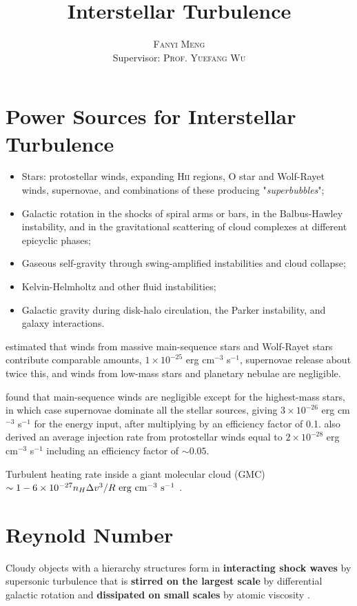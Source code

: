 \documentclass[12pt]{article}
\title{\textbf{Interstellar Turbulence}}
\author{\textsc{Fanyi Meng}\\
            Supervisor: \textsc{Prof. Yuefang Wu}}
\begin{document}
\maketitle\label{sec:title}
\clearpage
\tableofcontents
\clearpage
\section{Power Sources for Interstellar Turbulence} %
\label{sec:power_sources_for_interstellar_turbulence}
\begin{itemize}
    \item Stars: protostellar winds, expanding H\textsc{ii} regions, O star and Wolf-Rayet winds, supernovae, and  combinations of these producing "\emph{superbubbles}";
    \item Galactic rotation in the shocks of spiral arms or bars, in the Balbus-Hawley instability, and in the gravitational scattering of cloud complexes at different epicyclic phases;
    \item Gaseous self-gravity through swing-amplified instabilities and cloud collapse;
    \item Kelvin-Helmholtz and other fluid instabilities;
    \item Galactic gravity during disk-halo circulation, the Parker instability, and galaxy interactions.
\end{itemize}
\clearpage
\cite{1985ApJ...294..567V} estimated that winds from massive main-sequence stars and Wolf-Rayet stars contribute comparable amounts, $1 \times 10^{-25}$ erg cm$^{-3}$ s$^{-1}$, supernovae release about twice this, and winds from low-mass stars and planetary nebulae are negligible.

\cite{2004RvMP...76..125M} found that main-sequence winds are negligible except for the highest-mass stars, in which case supernovae dominate all the stellar sources, giving $3 \times 10^{-26}$ erg cm$^{-3}$ s$^{-1}$ for the energy input, after multiplying by an efficiency factor of 0.1. \cite{2004RvMP...76..125M} also derived an average injection rate from protostellar winds equal to $2 \times 10^{-28}$ erg cm$^{-3}$ s$^{-1}$  including an efficiency factor of $\sim 0.05$.

Turbulent heating rate inside a giant molecular cloud (GMC)  $\sim 1-6 \times 10^{-27} n_H\Delta v^3 / R \rm \  erg\ cm^{-3}\ s^{-1}$ \citep{1998ApJ...508L..99S}.
\newpage
\section{Reynold Number} %
\label{sec:Reynold Number}
    {Cloudy objects with a hierarchy structures form in \textbf{interacting shock waves} by supersonic turbulence that is \textbf{stirred on the largest scale} by differential galactic rotation and \textbf{dissipated on small scales} by atomic viscosity} \citep{1951ApJ...114..165V}.
\end{document}
